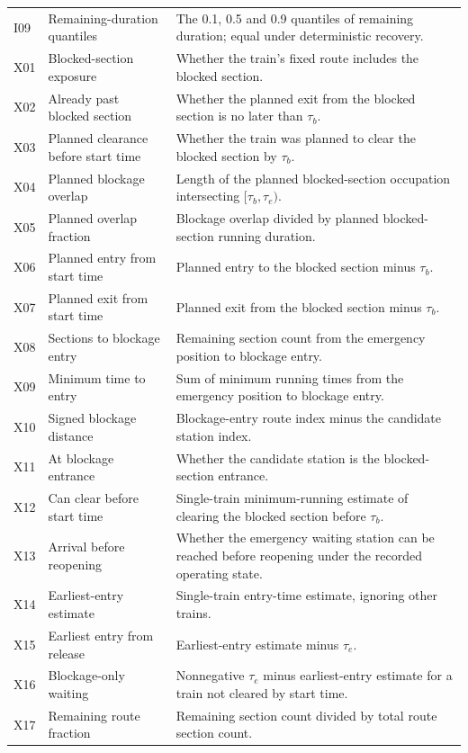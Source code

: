 \begin{longtable}{@{}>{\raggedright\arraybackslash}p{0.8cm}>{\raggedright\arraybackslash}p{3.7cm}>{\raggedright\arraybackslash}p{10.0cm}@{}}
I09 & Remaining-duration quantiles & The 0.1, 0.5 and 0.9 quantiles of remaining duration; equal under deterministic recovery. \\
X01 & Blocked-section exposure & Whether the train's fixed route includes the blocked section. \\
X02 & Already past blocked section & Whether the planned exit from the blocked section is no later than $\tau_b$. \\
X03 & Planned clearance before start time & Whether the train was planned to clear the blocked section by $\tau_b$. \\
X04 & Planned blockage overlap & Length of the planned blocked-section occupation intersecting $[\tau_b,\tau_e)$. \\
X05 & Planned overlap fraction & Blockage overlap divided by planned blocked-section running duration. \\
X06 & Planned entry from start time & Planned entry to the blocked section minus $\tau_b$. \\
X07 & Planned exit from start time & Planned exit from the blocked section minus $\tau_b$. \\
X08 & Sections to blockage entry & Remaining section count from the emergency position to blockage entry. \\
X09 & Minimum time to entry & Sum of minimum running times from the emergency position to blockage entry. \\
X10 & Signed blockage distance & Blockage-entry route index minus the candidate station index. \\
X11 & At blockage entrance & Whether the candidate station is the blocked-section entrance. \\
X12 & Can clear before start time & Single-train minimum-running estimate of clearing the blocked section before $\tau_b$. \\
X13 & Arrival before reopening & Whether the emergency waiting station can be reached before reopening under the recorded operating state. \\
X14 & Earliest-entry estimate & Single-train entry-time estimate, ignoring other trains. \\
X15 & Earliest entry from release & Earliest-entry estimate minus $\tau_e$. \\
X16 & Blockage-only waiting & Nonnegative $\tau_e$ minus earliest-entry estimate for a train not cleared by start time. \\
X17 & Remaining route fraction & Remaining section count divided by total route section count. \\

\end{longtable}
